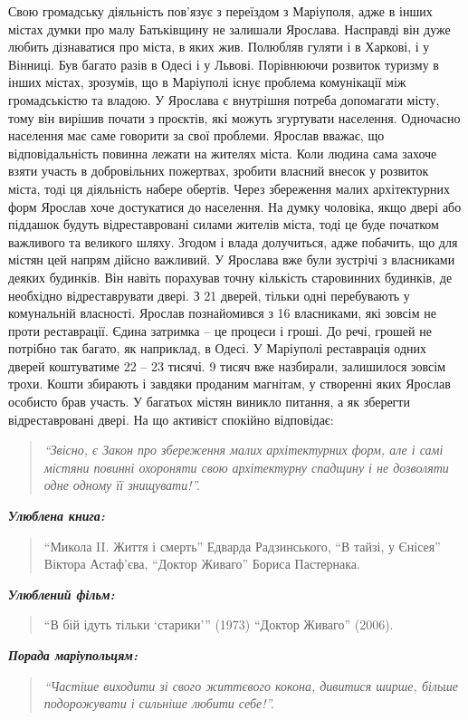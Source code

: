 
Свою громадську діяльність пов'язує з переїздом з Маріуполя, адже в інших
містах думки про малу Батьківщину не залишали Ярослава. Насправді він дуже
любить дізнаватися про міста,  в яких жив. Полюбляв гуляти і в Харкові, і у
Вінниці. Був багато разів в Одесі і у Львові. Порівнюючи розвиток туризму в
інших містах, зрозумів, що в Маріуполі існує проблема комунікації між
громадськістю та владою. У Ярослава є внутрішня потреба допомагати місту, тому
він вирішив почати з проєктів, які можуть згуртувати населення. Одночасно
населення має саме говорити за свої проблеми. Ярослав вважає, що
відповідальність повинна лежати на жителях міста. Коли людина сама захоче взяти
участь в добровільних пожертвах, зробити власний внесок у розвиток міста, тоді
ця діяльність набере обертів. Через збереження малих архітектурних форм Ярослав
хоче достукатися до населення. На думку чоловіка, якщо двері або піддашок
будуть відреставровані силами жителів міста, тоді це буде початком важливого та
великого шляху. Згодом і влада долучиться, адже побачить, що для містян цей
напрям дійсно важливий.  У Ярослава вже були зустрічі з власниками деяких
будинків. Він навіть порахував точну кількість старовинних  будинків, де
необхідно відреставрувати двері. З 21 дверей, тільки одні перебувають у
комунальній власності. Ярослав познайомився з 16 власниками, які зовсім не
проти реставрації. Єдина затримка – це процеси і гроші. До речі, грошей не
потрібно так багато, як наприклад, в Одесі. У Маріуполі реставрація одних
дверей коштуватиме 22 – 23 тисячі. 9 тисяч вже назбирали, залишилося зовсім
трохи. Кошти збирають і завдяки проданим магнітам, у створенні яких Ярослав
особисто брав участь. У багатьох містян виникло питання, а як зберегти
відреставровані двері. На що активіст спокійно відповідає: 

\begin{quote}
\em\enquote{Звісно, є Закон про
збереження малих архітектурних форм, але і самі містяни повинні охороняти свою
архітектурну спадщину і не дозволяти одне одному її знищувати!}. 
\end{quote}


\emph{\textbf{Улюблена книга:}} 

\begin{quote}
\enquote{Микола II. Життя і смерть} Едварда Радзинського, \enquote{В тайзі, у Єнісея} Віктора Астаф'єва, \enquote{Доктор Живаго} Бориса Пастернака.
\end{quote}

\emph{\textbf{Улюблений фільм:}} 

\begin{quote}
\enquote{В бій ідуть тільки \enquote{старики}} (1973) \enquote{Доктор Живаго} (2006).
\end{quote}

\emph{\textbf{Порада маріупольцям:}} 

\begin{quote}
\em\enquote{Частіше виходити зі свого життєвого кокона, дивитися ширше, більше подорожувати і сильніше любити себе!}.
\end{quote}
